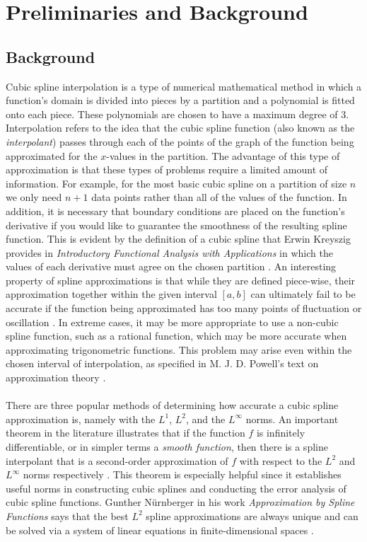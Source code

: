 

\chapter{Preliminaries and Background}
\label{chapter2}
\thispagestyle{empty}

\section{Background}
Cubic spline interpolation is a type of numerical mathematical method in which a function's domain is divided into pieces by a partition and a polynomial is fitted onto each piece. These polynomials are chosen to have a maximum degree of 3. Interpolation refers to the idea that the cubic spline function (also known as the \emph{interpolant}) passes through each of the points of the graph of the function being approximated for the $x$-values in the partition. The advantage of this type of approximation is that these types of problems require a limited amount of information. For example, for the most basic cubic spline on a partition of size $n$ we only need $n+1$ data points rather than all of the values of the function. In addition, it is necessary that boundary conditions are placed on the function's derivative if you would like to guarantee the smoothness of the resulting spline function. This is evident by the definition of a cubic spline that Erwin Kreyszig provides in \emph{Introductory Functional Analysis with Applications} in which the values of each derivative must agree on the chosen partition \cite[pg.~358]{key4}. An interesting property of spline approximations is that while they are defined piece-wise, their approximation together within the given interval $[a,b]$ can ultimately fail to be accurate if the function being approximated has too many points of fluctuation or oscillation \cite[pg.~28]{key8}. In extreme cases, it may be more appropriate to use a non-cubic spline function, such as a rational function, which may be more accurate when approximating trigonometric functions. This problem may arise even within the chosen interval of interpolation, as specified in M. J. D. Powell's text on approximation theory \cite[pg.~28]{key8}.
\\\\
There are three popular methods of determining how accurate a cubic spline approximation is, namely with the $L^1$, $L^2$, and the $L^\infty$ norms. An important theorem in the literature illustrates that if the function $f$ is infinitely differentiable, or in simpler terms a \emph{smooth function}, then there is a spline interpolant that is a second-order approximation of $f$ with respect to the $L^2$ and $L^\infty$ norms respectively \cite[pg.~19]{key9}. This theorem is especially helpful since it establishes useful norms in constructing cubic splines and conducting the error analysis of cubic spline functions. Gunther N\"{u}rnberger in his work \emph{Approximation by Spline Functions} says that the best $L^{2}$ spline approximations are always unique and can be solved via a system of linear equations in finite-dimensional spaces \cite[pg.~76]{key6}.

